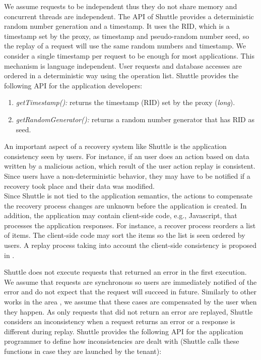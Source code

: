 We assume requests to be independent thus they do not share memory and concurrent threads are independent. The \ac{API} of Shuttle provides a deterministic random number generation and a timestamp. It uses the \ac{RID}, which is a timestamp set by the proxy, as timestamp and pseudo-random number seed, so the replay of a request will use the same random numbers and timestamp. We consider a single timestamp per request to be enough for most applications. This mechanism is language independent. User requests and database accesses are ordered in a deterministic way using the operation list. Shuttle provides the following \ac{API} for the application developers:

\begin{enumerate}
  \item \textit{getTimestamp():} returns the timestamp (\ac{RID}) set by the proxy (\textit{long}).
  \item \textit{getRandomGenerator():} returns a random number generator that has \ac{RID} as seed.
\end{enumerate}

An important aspect of a recovery system like Shuttle is the application consistency seen by users. For instance, if an user does an action based on data written by a malicious action, which result of the user action replay is consistent. Since users have a non-deterministic behavior, they may have to be notified if a recovery took place and their data was modified. \\


Since Shuttle is not tied to the application semantics, the actions to compensate the recovery process changes are unknown before the application is created. In addition, the application may contain client-side code, e.g., Javascript, that processes the application responses. For instance, a recover process reorders a list of items. The client-side code may sort the items so the list is seen ordered by users. A replay process taking into account the client-side consistency is proposed in \cite{warp}.


Shuttle does not execute requests that returned an error in the first execution. We assume that requests are synchronous so users are immediately notified of the error and do not expect that the request will succeed in future. Similarly to other works in the area \cite{undoForOperators}, we assume that these cases are compensated by the user when they happen. As only requests that did not return an error are replayed, Shuttle considers an inconsistency when a request returns an error or a response is different during replay. Shuttle provides the following \ac{API} for the application programmer to define how inconsistencies are dealt with (Shuttle calls these functions in case they are launched by the tenant):

